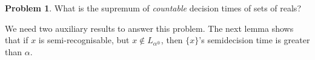\documentclass[a4paper,11pt]{amsart}
\theoremstyle{definition}
\newtheorem*{problem*}{Problem}
\newtheorem*{problem A}{Problem 1}
\newtheorem*{problem B}{Problem 2}
\theoremstyle{remark}
\begin{document}
\begin{problem*} 
What is the supremum of \textit{countable} decision times of sets of reals? 
\end{problem*} 




We need two auxiliary results to answer this problem. 
The next lemma shows that if $x$ is semi-recognisable, but $x\notin L_{\alpha^\oplus}$, then $\{x\}$'s semidecision  time is greater than $\alpha$. 
\end{document}
